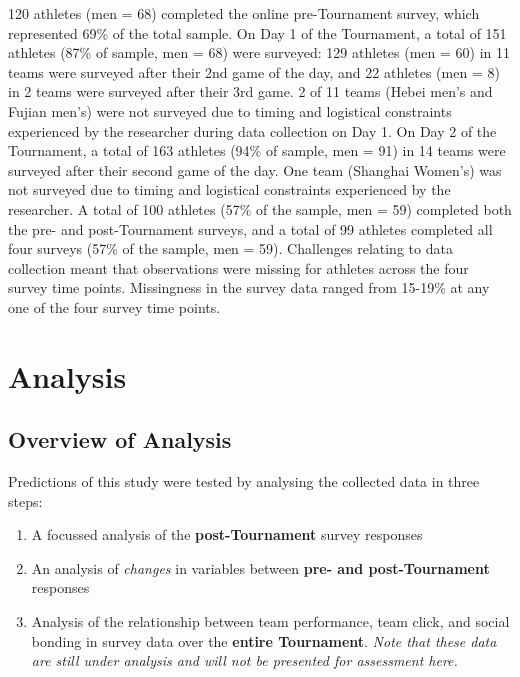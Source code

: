 120 athletes (men = 68) completed the online pre-Tournament survey, which represented 69\% of the total sample. On Day 1 of the Tournament, a total of 151 athletes (87\% of sample, men = 68) were surveyed: 129 athletes (men = 60) in 11 teams were surveyed after their 2nd game of the day, and 22 athletes (men = 8) in 2 teams were surveyed after their 3rd game. 2 of 11 teams (Hebei men’s and Fujian men’s) were not surveyed due to timing and logistical constraints experienced by the researcher during data collection on Day 1. On Day 2 of the Tournament, a total of 163 athletes (94\% of sample, men = 91) in 14 teams were surveyed after their second game of the day. One team (Shanghai Women’s) was not surveyed due to timing and logistical constraints experienced by the researcher. A total of 100 athletes (57\% of the sample, men = 59) completed both the pre- and post-Tournament surveys, and a total of 99 athletes completed all four surveys (57\% of the sample, men = 59). Challenges relating to data collection meant that observations were missing for athletes across the four survey time points. Missingness in the survey data ranged from 15-19\% at any one of the four survey time points.\\












\clearpage
\section{Analysis}


\subsection{Overview of Analysis}

Predictions of this study were tested by analysing the collected data in three steps:

\begin{enumerate}
  \item A focussed analysis of the \textbf{post-Tournament} survey responses
  \item An analysis of \textit{changes} in variables between \textbf{pre- and post-Tournament} responses
  \item Analysis of the relationship between team performance, team click, and social bonding in survey data over the \textbf{entire Tournament}. \textit{Note that these data are still under analysis and will not be presented for assessment here.}
\end{enumerate}

